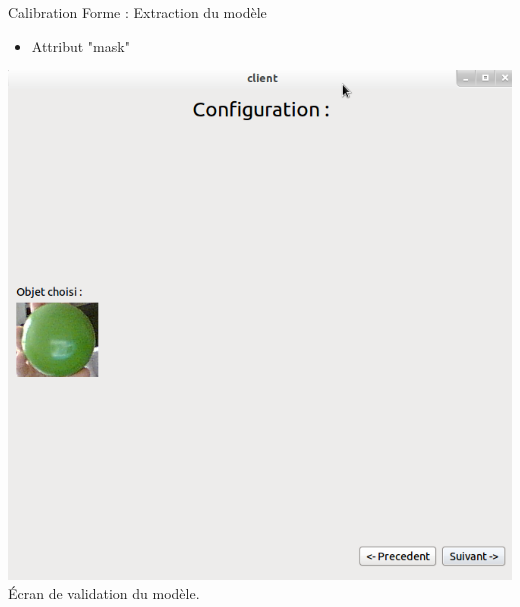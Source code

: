 \documentclass{beamer}
\begin{document}
	    \begin{frame}{Calibration Forme : Extraction du modèle}
                  \begin{itemize}
                        \item{Attribut "mask"}
                  \end{itemize}
                  \begin{center}
                        \includegraphics[scale=0.25]{Capture7.png}\\
                        Écran de validation du modèle.
                  \end{center}
            \end{frame}
            
\end{document}

